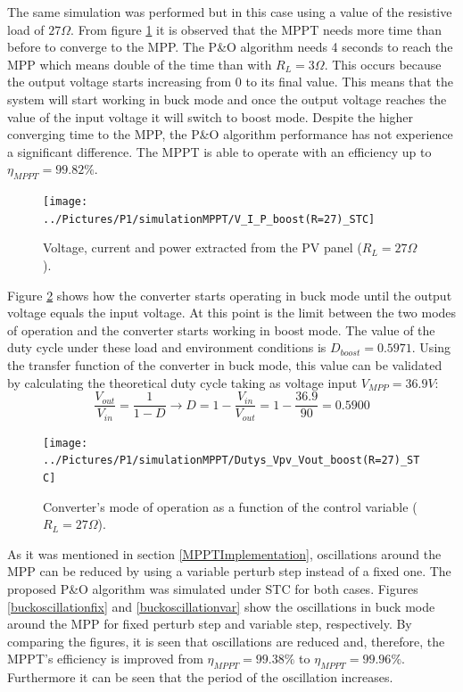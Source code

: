 The same simulation was performed but in this case using a value of the resistive load of $27\Omega$. From figure \ref{boostSTC} it is observed that the MPPT needs more time than before to converge to the MPP. The P\&O algorithm needs 4 seconds to reach the MPP which means double of the time than with $R_{L}=3\Omega$. This occurs because the output voltage starts increasing from 0 to its final value. This means that the system will start working in buck mode and once the output voltage reaches the value of the input voltage it will switch to boost mode. Despite the higher converging time to the MPP, the P\&O algorithm performance has not experience a significant difference. The MPPT is able to operate with an efficiency up to $\eta_{MPPT} = 99.82\% $.



\begin{figure}[H]
	\begin{center}
		\texttt{[image: ../Pictures/P1/simulationMPPT/V\_I\_P\_boost(R=27)\_STC]}
		\caption{Voltage, current and power extracted from the PV panel ($R_{L}=27\Omega$).}
		\label{boostSTC} 
	\end{center}	
\end{figure}

Figure \ref{boostSTC_duty} shows how the converter starts operating in buck mode until the output voltage equals the input voltage. At this point is the limit between the two modes of operation and the converter starts working in boost mode. The value of the duty cycle under these load and environment conditions is $D_{boost}= 0.5971$. Using the transfer function of the converter in  buck mode, this value can be validated by calculating the theoretical duty cycle taking as voltage input $V_{MPP}=36.9 V$: 
\begin{equation}
\frac{V_{out}}{V_{in}}= \frac{1}{1-D} \rightarrow D = 1 - \frac{V_{in}}{V_{out}} = 1 - \frac{36.9}{90} = 0.5900
\end{equation}
 
\begin{figure}[H]
	\begin{center}
		\texttt{[image: ../Pictures/P1/simulationMPPT/Dutys\_Vpv\_Vout\_boost(R=27)\_STC]}
		\caption{Converter's mode of operation as a function of the control variable ($R_{L}=27\Omega$).}
		\label{boostSTC_duty} 
	\end{center}	
\end{figure}

As it was mentioned in section \ref{MPPTImplementation}, oscillations around the MPP can be reduced by using a variable perturb step instead of a fixed one. The proposed P\&O algorithm was simulated under STC for both cases. Figures \ref{buckoscillationfix} and \ref{buckoscillationvar} show the oscillations in buck mode around the MPP for fixed perturb step and variable step, respectively. By comparing the figures, it is seen that oscillations are reduced and, therefore, the MPPT's efficiency is improved from $\eta_{MPPT} = 99.38\% $ to $\eta_{MPPT} = 99.96\% $. Furthermore it can be seen that the period of the oscillation increases. 

